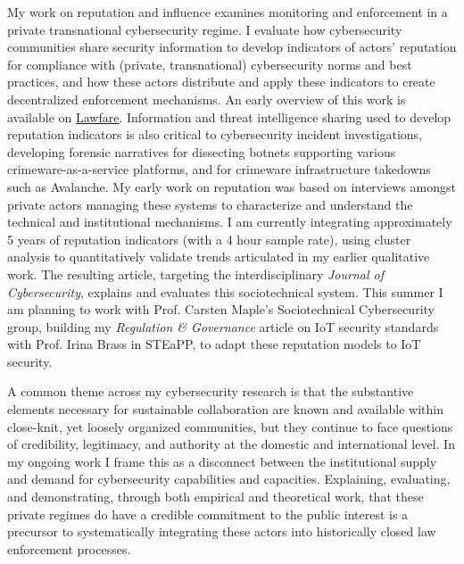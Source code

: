 \documentclass[11pt]{letter}
\begin{document}
\begin{letter}
My work on reputation and influence examines monitoring and enforcement in a private transnational cybersecurity regime.
%
I evaluate how cybersecurity communities share security information to develop indicators of actors' reputation for compliance with (private, transnational) cybersecurity norms and best practices, and how these actors distribute and apply these indicators to create decentralized enforcement mechanisms.
%
An early overview of this work is available on  \href{https://www.lawfareblog.com/role-norms-internet-security-reputation-and-its-limits}{Lawfare}.
%
Information and threat intelligence sharing used to develop reputation indicators is also critical to cybersecurity incident investigations, developing forensic narratives for dissecting botnets supporting various crimeware-as-a-service platforms, and for crimeware infrastructure takedowns such as Avalanche.
% 
My early work on reputation was based on interviews amongst private actors managing these systems to characterize and understand the technical and institutional mechanisms. 
%
I am currently integrating approximately 5 years of reputation indicators (with a 4 hour sample rate), using cluster analysis to quantitatively validate trends articulated in my earlier qualitative work.
%
The resulting article, targeting the interdisciplinary \emph{Journal of Cybersecurity}, explains and evaluates this sociotechnical system.
%
This summer I am planning to work with Prof. Carsten Maple's Sociotechnical Cybersecurity group, building my \emph{Regulation \& Governance} article on IoT security standards with Prof. Irina Brass in STEaPP, to adapt these reputation models to IoT security. 


%
%

A common theme across my cybersecurity research is that the substantive elements necessary for sustainable collaboration are known and available within close-knit, yet loosely organized communities, but they continue to face questions of credibility, legitimacy, and authority at the domestic and international level.
%
In my ongoing work I frame this as a disconnect between the institutional supply and demand for cybersecurity capabilities and capacities.
%
Explaining, evaluating, and demonstrating, through both empirical and theoretical work, that these private regimes do have a credible commitment to the public interest is a precursor to systematically integrating these actors into historically closed law enforcement processes.


\end{letter}
\end{document}
